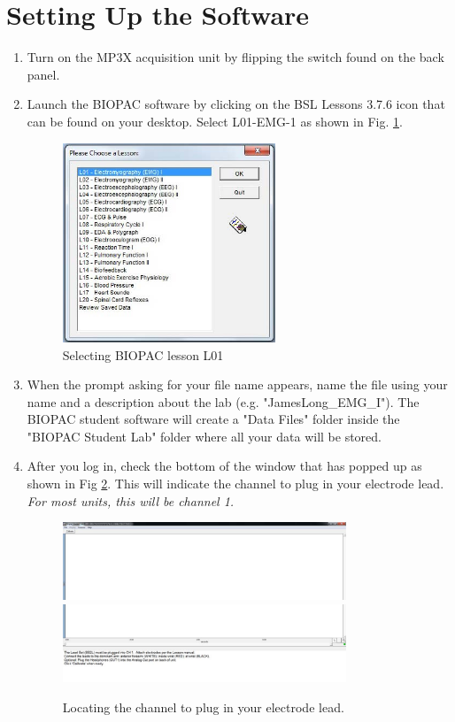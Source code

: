 \documentclass{article}
\begin{document}
\section*{Setting Up the Software}
\begin{enumerate}
	\item Turn on the MP3X acquisition unit by flipping the switch found on the back panel.
	\item Launch the BIOPAC software by clicking on the BSL Lessons 3.7.6 icon that can be found on your desktop. Select L01-EMG-1 as shown in Fig. \ref{lesson}.
		\begin{figure}[h]
	\includegraphics[width=0.6\textwidth]{../images/EMG_I_4.jpg}
		\centering
		\caption{Selecting BIOPAC lesson L01}
		\label{lesson}
		\end{figure}
		
	\item When the prompt asking for your file name appears, name the file using your name and a description about the lab (e.g. "JamesLong\_EMG\_I"). The BIOPAC student software will create a "Data Files" folder inside the "BIOPAC Student Lab" folder where all your data will be stored.
	\item After you log in, check the bottom of the window that has popped up as shown in Fig \ref{channel}. This will indicate  the channel to plug in your electrode lead. \textit{For most units, this will be channel 1.}
		\begin{figure}[h]
	\includegraphics[width=0.8\textwidth]{../images/EMG_I_5a.jpg}
	\includegraphics[width=0.8\textwidth]{../images/EMG_I_5b.jpg}
		\centering
		\caption{Locating the channel to plug in your electrode lead.}
		\label{channel}
		\end{figure}
	

\end{enumerate}
\end{document}
